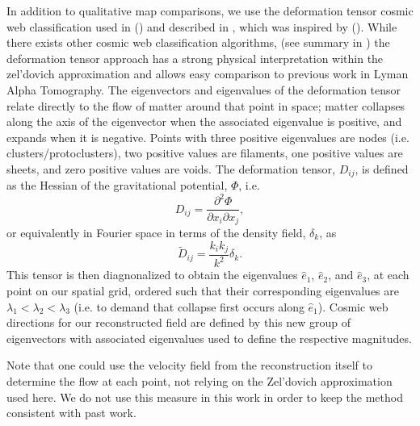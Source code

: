 \documentclass[usenatbib,onecolumn]{mnras}
\begin{document}
In addition to qualitative map comparisons, we use the deformation tensor cosmic web classification used in (\cite{2017Krolewski,2018Krolewski}) and described in \cite{2016LeeWhite}, which was inspired by (\cite{2007Hahn}). While there exists other cosmic web classification algorithms, (see summary in \cite{2014Cautun}) the deformation tensor approach has a strong physical interpretation within the zel'dovich approximation and allows easy comparison to previous work in Lyman Alpha Tomography. The eigenvectors and eigenvalues of the deformation tensor relate directly to the flow of matter around that point in space; matter collapses along the axis of the eigenvector when the associated eigenvalue is positive, and expands when it is negative. Points with three positive eigenvalues are nodes (i.e. clusters/protoclusters), two positive values are filaments, one positive values are sheets, and zero positive values are voids. The deformation tensor, $D_{ij}$, is defined as the Hessian of the gravitational potential, $\Phi$, i.e.
\begin{equation}
    D_{ij} = \frac{\partial^2 \Phi}{\partial x_{i} \partial x_{j}},
    \label{eq:diften}
\end{equation}
or equivalently in Fourier space in terms of the density field, $\delta_k$, as
\begin{equation}
    \tilde{D}_{ij} = \frac{k_i k_j}{k^2}\delta_k.
    \label{eq:diften_k}
\end{equation}
This tensor is then diagnonalized to obtain the eigenvalues $\hat{e}_1$, $\hat{e}_2$, and $\hat{e}_3$, at each point on our spatial grid, ordered such that their corresponding eigenvalues are $\lambda_1<\lambda_2<\lambda_3$ (i.e. to demand that collapse first occurs along $\hat{e}_1$). Cosmic web directions for our reconstructed field are defined by this new group of eigenvectors with associated eigenvalues used to define the respective magnitudes. 

Note that one could use the velocity field from the reconstruction itself to determine the flow at each point, not relying on the Zel'dovich approximation used here. We do not use this measure in this work in order to keep the method consistent with past work.


\end{document}
